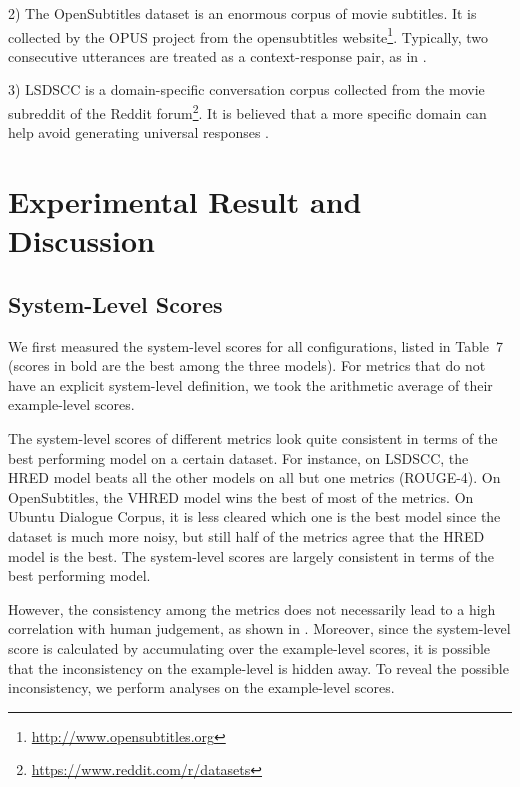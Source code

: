 \documentclass[conference]{IEEEtran}
\begin{document}
2) The OpenSubtitles dataset \cite{opensub} is an enormous corpus of movie subtitles.
It is collected by the OPUS project \cite{OPUS} from the opensubtitles website\footnote{\url{http://www.opensubtitles.org}}.
Typically, two consecutive utterances are treated as a context-response pair, as in \cite{GoogleChatbot,MMI}.

3) LSDSCC \cite{LSDSCC} is a domain-specific conversation corpus collected from the movie subreddit of the Reddit forum\footnote{\url{https://www.reddit.com/r/datasets}}.
It is believed that a more specific domain can help avoid generating universal responses \cite{LSDSCC}.


\section{Experimental Result and Discussion}
\subsection{System-Level Scores}
We first measured the system-level scores for all configurations, listed in Table~7 (scores in bold are the best among the three models).
For metrics that do not have an explicit system-level definition, we took the arithmetic average of their example-level scores.


The system-level scores of different metrics look quite consistent in terms of the best performing model on a certain dataset.
For instance, on LSDSCC, the HRED model beats all the other models on all but one metrics (ROUGE-4).
On OpenSubtitles, the VHRED model wins the best of most of the metrics.
On Ubuntu Dialogue Corpus, it is less cleared which one is the best model since the dataset is much more noisy,
but still half of the metrics agree that the HRED model is the best.
The system-level scores are largely consistent in terms of the best performing model.

However, the consistency among the metrics does not necessarily lead to a high correlation with human judgement, as shown in \cite{HowNot}.
Moreover, since the system-level score is calculated by accumulating over the example-level scores,
it is possible that the inconsistency on the example-level is hidden away.
To reveal the possible inconsistency, we perform analyses on the example-level scores.
\end{document}
